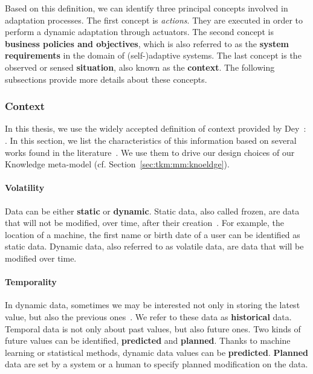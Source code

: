 Based on this definition, we can identify three principal concepts involved in adaptation processes.
The first concept is  \textit{actions}. They are executed in order to perform a dynamic adaptation through actuators.
The second concept is \textbf{business policies and objectives}, which is also referred to as the \textbf{system requirements} in the domain of (self-)adaptive systems.
The last concept is the observed or sensed \textbf{situation}, also known as the \textbf{context}.
The following subsections provide more details about these concepts.

\subsubsection{Context}

In this thesis, we use the widely accepted definition of context provided by \linebreak Dey~\cite{DBLP:journals/puc/Dey01}: .
In this section, we list the characteristics of this information based on several works found in the literature~\cite{DBLP:conf/pervasive/HenricksenIR02, DBLP:conf/seke/0001FNMKT14, DBLP:journals/percom/BettiniBHINRR10, DBLP:journals/comsur/PereraZCG14}.
We use them to drive our design choices of our Knowledge meta-model (cf. Section~\ref{sec:tkm:mm:knoeldge}).

\paragraph{Volatility}
Data can be either \textbf{static} or \textbf{dynamic}.
Static data, also called frozen, are data that will not be modified, over time, after their creation~\cite{DBLP:conf/pervasive/HenricksenIR02, DBLP:journals/comsur/MakrisSS13, DBLP:journals/percom/BettiniBHINRR10}.
For example, the location of a machine, the first name or birth date of a user can be identified as static data. 
Dynamic data, also referred to as volatile data, are data that will be modified over time.

\paragraph{Temporality}
In dynamic data, sometimes we may be interested not only in storing the latest value, but also the previous ones~\cite{DBLP:conf/seke/0001FNMKT14, DBLP:conf/pervasive/HenricksenIR02}. 
We refer to these data as \textbf{historical} data.
Temporal data is not only about past values, but also future ones. 
Two kinds of future values can be identified, \textbf{predicted} and \textbf{planned}.  
Thanks to machine learning or statistical methods, dynamic data values can be \textbf{predicted}. 
\textbf{Planned} data are set by a system or a human to specify planned modification on the data.

